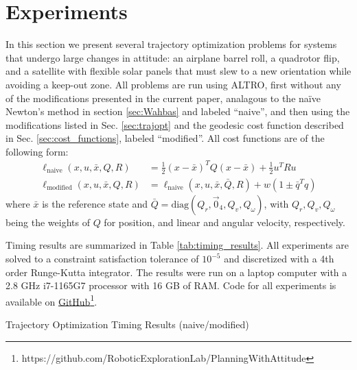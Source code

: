 \documentclass[letterpaper, 10 pt, conference]{ieeeconf}  %
\newcommand{\half}{\frac{1}{2}}
\newcommand{\todo}[1]{\textcolor{red}{TODO: #1}}
\begin{document}

\section{Experiments} \label{sec:experiments}
    In this section we present several trajectory optimization problems for systems that
    undergo large changes in attitude: an airplane barrel roll, a quadrotor flip, and a
    satellite with flexible solar panels that must slew to a new orientation while
    avoiding a keep-out zone.    
    All problems are run using ALTRO, first without any of the modifications presented in
    the current paper, analagous to the na\"ive Newton's method in section \ref{sec:Wahbas}
    and labeled ``naive'', and then using the modifications listed in Sec.
    \ref{sec:trajopt} and the geodesic cost function described in Sec.
    \ref{sec:cost_functions}, labeled ``modified''. All cost functions are of the
    following form:
    \begin{align}
        \ell_\text{naive}(x, u, \bar{x}, Q, R) &= \half (x - \bar{x})^T Q (x - \bar{x}) + \half u^T R u \\
        \ell_\text{modified}(x, u, \bar{x}, Q, R) 
            &= \ell_\text{naive}(x, u, \bar{x}, \bar{Q}, R) + w (1 \pm \bar{q}^T q)
    \end{align}
    where $\bar{x}$ is the reference state and $\bar{Q} = \text{diag}(Q_r, \vec{0}_4,
    Q_v, Q_\omega)$, with $Q_r,Q_v,Q_\omega$ being the weights of $Q$ for position, and
    linear and angular velocity, respectively.
    
    Timing results are summarized in Table \ref{tab:timing_results}. All experiments are 
    solved to a constraint satisfaction tolerance of $10^{-5}$ and discretized with a 4th 
    order Runge-Kutta integrator. The results were run on a laptop computer with a 2.8 GHz 
    i7-1165G7 processor with 16 GB of RAM. Code for all experiments is available on
    \href{https://github.com/RoboticExplorationLab/PlanningWithAttitude}
    {GitHub\footnote{\url{https://github.com/RoboticExplorationLab/PlanningWithAttitude}}}.

    \begin{table}
        \centering
        \caption{Trajectory Optimization Timing Results (naive/modified)}
        
        \label{tab:timing_results}
    \end{table}
        
\end{document}
